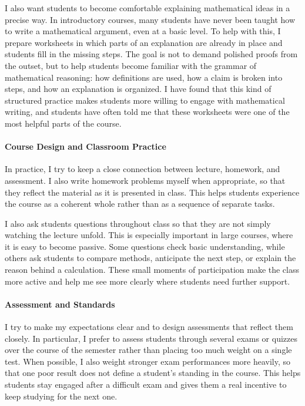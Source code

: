 \documentclass[11pt]{article}
\begin{document}
I also want students to become comfortable explaining mathematical ideas in a precise way. In introductory courses, many students have never been taught how to write a mathematical argument, even at a basic level. To help with this, I prepare worksheets in which parts of an explanation are already in place and students fill in the missing steps. The goal is not to demand polished proofs from the outset, but to help students become familiar with the grammar of mathematical reasoning: how definitions are used, how a claim is broken into steps, and how an explanation is organized. I have found that this kind of structured practice makes students more willing to engage with mathematical writing, and students have often told me that these worksheets were one of the most helpful parts of the course.

\paragraph{Course Design and Classroom Practice}\quad

In practice, I try to keep a close connection between lecture, homework, and assessment. I also write homework problems myself when appropriate, so that they reflect the material as it is presented in class. This helps students experience the course as a coherent whole rather than as a sequence of separate tasks.

I also ask students questions throughout class so that they are not simply watching the lecture unfold. This is especially important in large courses, where it is easy to become passive. Some questions check basic understanding, while others ask students to compare methods, anticipate the next step, or explain the reason behind a calculation. These small moments of participation make the class more active and help me see more clearly where students need further support.

\paragraph{Assessment and Standards}\quad

I try to make my expectations clear and to design assessments that reflect them closely. In particular, I prefer to assess students through several exams or quizzes over the course of the semester rather than placing too much weight on a single test. When possible, I also weight stronger exam performances more heavily, so that one poor result does not define a student’s standing in the course. This helps students stay engaged after a difficult exam and gives them a real incentive to keep studying for the next one.
\end{document}
